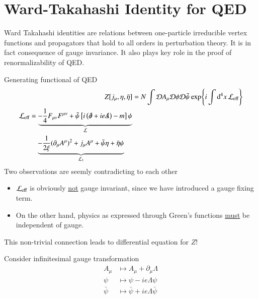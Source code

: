 
\section{Ward-Takahashi Identity for QED}
Ward Takahashi identities are relations between one-particle irreducible vertex functions and propagators that hold to all orders in perturbation theory. It is in fact consequence of gauge invariance. It also plays key role in the proof of renormalizability of QED.

Generating functional of QED
\begin{align}
   Z[j_\mu, \eta, \bar{\eta}] &= N \int \mathcal{D} A_\mu \mathcal{D} \phi \mathcal{D} \bar\psi \exp{i\int \dd[4]{x} \mathcal{L}_{\text{eff}}} \\
   \begin{split}
      \mathcal{L}_{\text{eff}} &= \underbrace{-\frac{1}{4} F_{\mu\nu}F^{\mu\nu} + \bar{\psi} \left[ i \left( \slashed{\partial} + ie \slashed{A} \right)  - m\right]\psi}_{\mathcal{L}} \\
                        &\quad  \underbrace{- \frac{1}{2\xi} (\partial_\mu A^\mu)^2 + j_\mu A^\mu + \bar\psi \eta + \bar\eta \psi}_{\mathcal{L}_1}
   \end{split}
\end{align}
Two observations are seemly contradicting to each other
\begin{itemize}
   \item $\mathcal{L}_{\text{eff}}$ is obviously \underline{not} gauge invariant, since we have introduced a gauge fixing term.
   \item On the other hand, physics as expressed through Green's functions \underline{must} be independent of gauge.
\end{itemize}
This non-trivial connection leads to differential equation for $Z$!

Consider infinitesimal gauge transformation
\begin{align*}
   A_\mu &\mapsto A_\mu + \partial_\mu \Lambda \\
   \psi &\mapsto \psi - ie \Lambda \psi \\
   \bar\psi &\mapsto \bar\psi + ie \Lambda \bar\psi
\end{align*}

